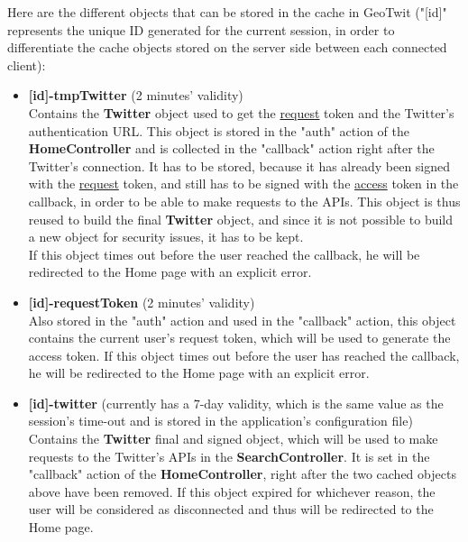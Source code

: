 \documentclass[a4paper,11pt]{report}
\begin{document}
Here are the different objects that can be stored in the cache in GeoTwit ("[id]" represents the unique ID generated for the current session, in order to differentiate the cache objects stored on the server side between each connected client):
\begin{itemize}
	\item \textbf{[id]-tmpTwitter} (2 minutes' validity)\\
	Contains the \textbf{Twitter} object used to get the \underline{request} token and the Twitter's authentication URL. This object is stored in the "auth" action of the \textbf{HomeController} and is collected in the "callback" action right after the Twitter's connection. It has to be stored, because it has already been signed with the \underline{request} token, and still has to be signed with the \underline{access} token in the callback, in order to be able to make requests to the APIs. This object is thus reused to build the final \textbf{Twitter} object, and since it is not possible to build a new object for security issues, it has to be kept.\\
	If this object times out before the user reached the callback, he will be redirected to the Home page with an explicit error.
	\item \textbf{[id]-requestToken} (2 minutes' validity)\\
	Also stored in the "auth" action and used in the "callback" action, this object contains the current user's request token, which will be used to generate the access token. If this object times out before the user has reached the callback, he will be redirected to the Home page with an explicit error.
	\item \textbf{[id]-twitter} (currently has a 7-day validity, which is the same value as the session's time-out and is stored in the application's configuration file)\\
	Contains the \textbf{Twitter} final and signed object, which will be used to make requests to the Twitter's APIs in the \textbf{SearchController}. It is set in the "callback" action of the \textbf{HomeController}, right after the two cached objects above have been removed. If this object expired for whichever reason, the user will be considered as disconnected and thus will be redirected to the Home page.
\end{itemize}
\end{document}

